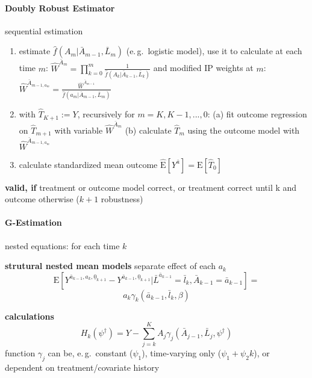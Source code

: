 \documentclass[8pt]{extarticle}
\begin{document}
\begin{multicols}{2}
\paragraph{\large Doubly Robust Estimator} sequential estimation
\begin{enumerate}[leftmargin=*, itemsep=0em, topsep=0pt, partopsep=0pt,parsep=0pt]
\setlength{\itemsep}{0pt}%
\setlength{\parskip}{0pt}
\item 
estimate $\hat{f}\left(A_m|\bar{A}_{m-1}, \bar{L}_m\right)$ (e.\,g.\ logistic model), use it to \newline
calculate at each time $m$: $\widehat{W}^{\bar{A}_m} = \prod_{k=0}^m\frac{1}{\hat{f}\left(A_k|\bar{A}_{k-1}, \bar{L}_k\right)}$ and modified IP weights at $m$: $\widehat{W}^{\bar{A}_{m-1, a_m}} = \frac{\widehat{W}^{\bar{A}_{m-1}}}{\hat{f}\left(a_m|\bar{A}_{m-1}, \bar{L}_m\right)} $
\item with $\widehat{T}_{K+1}:=Y$, recursively for $m=K, K-1, ..., 0$:\newline
 (a) fit outcome regression on $\widehat{T}_{m+1}$ with variable  $\widehat{W}^{\bar{A}_m}$\newline
 (b) calculate $\widehat{T}_{m}$ using the outcome model with $\widehat{W}^{\bar{A}_{m-1, a_m}}$
\item calculate standardized mean outcome $\widehat{\mathrm{E}}\left[Y^{\bar{a}}\right] = \mathrm{E}\left[\widehat{T}_0\right]$
\end{enumerate}

\noindent \textbf{valid, if} treatment or outcome model correct, or treatment correct until k and outcome otherwise ($k+1$ robustness)


\paragraph{\large G-Estimation} nested equations: for each time $k$

\noindent \textbf{strutural nested mean models} separate effect of each $a_k$
$$\mathrm{E}\left[Y^{\bar{a}_{k-1}, a_k, \underline{0}_{k+1}} - Y^{\bar{a}_{k-1}, \underline{0}_{k+1}}|\bar{L}^{\bar{a}_{k-1}}=\bar{l}_k, \bar{A}_{k-1} = \bar{a}_{k-1}\right] = $$
$$  a_k\gamma_k\left(\bar{a}_{k-1}, \bar{l}_k,\beta\right)$$
\noindent 

\noindent \textbf{calculations}
$$H_k\left(\psi^\dagger\right) = Y - \sum_{j=k}^K A_j \gamma_j\left(\bar{A}_{j-1}, \bar{L}_j, \psi^\dagger\right)$$
\noindent function $\gamma_j$ can be, e.\,g.\ constant ($\psi_1$), time-varying only ($\psi_1+\psi_2k$), or dependent on treatment/covariate history


\end{multicols}
\end{document}
